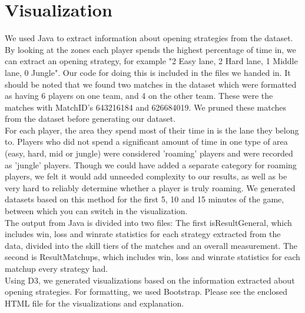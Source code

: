 \documentclass[a4paper,11pt]{article}
\begin{document}
\section{Visualization}
We used Java to extract information about opening strategies from the dataset. By looking at the zones each player spends the highest percentage of time in, we can extract an opening strategy, for example "2 Easy lane, 2 Hard lane, 1 Middle lane, 0 Jungle". Our code for doing this is included in the files we handed in.
It should be noted that we found two matches in the dataset which were formatted as having 6 players on one team, and 4 on the other team. These were the matches with MatchID's 643216184 and 626684019. We pruned these matches from the dataset before generating our dataset.\\


For each player, the area they spend most of their time in is the lane they belong to. Players who did not spend a significant amount of time in one type of area (easy, hard, mid or jungle) were considered 'roaming' players and were recorded as 'jungle' players. Though we could have added a separate category for roaming players, we felt it would add unneeded complexity to our results, as well as be very hard to reliably determine whether a player is truly roaming. We generated datasets based on this method for the first 5, 10 and 15 minutes of the game, between which you can switch in the visualization.\\

 
The output from Java is divided into two files: The first isResultGeneral, which includes win, loss and winrate statistics for each strategy extracted from the data, divided into the skill tiers of the matches and an overall measurement. The second is ResultMatchups, which includes win, loss and winrate statistics for each matchup every strategy had.\\

Using D3, we generated visualizations based on the information extracted about opening strategies. For formatting, we used Bootstrap.
Please see the enclosed HTML file for the visualizations and explanation.




  
\end{document}
